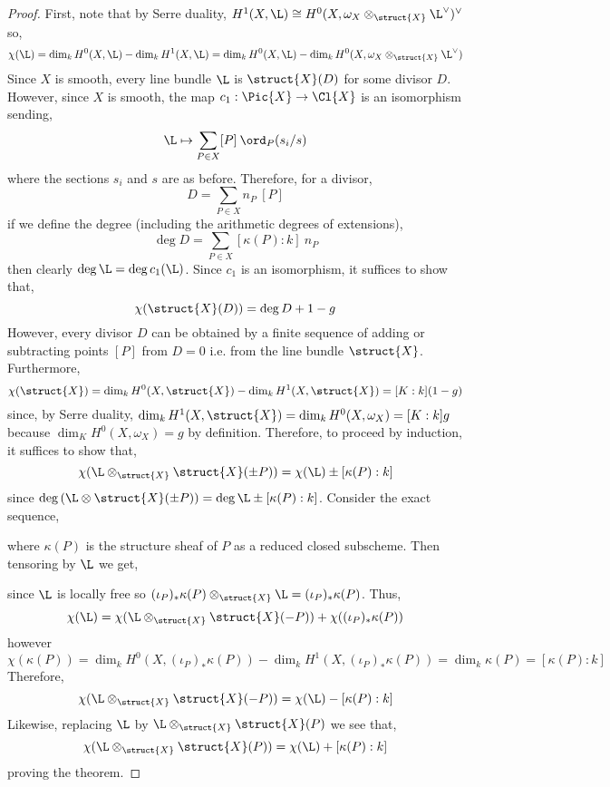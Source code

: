\begin{proof}
First, note that by Serre duality, $H^1(X, \L) \cong H^0(X, \omega_X \otimes_{\struct{X}} \L^\vee)^\vee$ so,
\[ \chi(\L) = \dim_k H^0(X, \L) - \dim_k H^1(X, \L) = \dim_k H^0(X, \L) - \dim_k H^0(X, \omega_X \otimes_{\struct{X}} \L^\vee) \]
Since $X$ is smooth, every line bundle $\L$ is $\struct{X}(D)$ for some divisor $D$. However, since $X$ is smooth, the map $c_1 : \Pic{X} \to \Cl{X}$ is an isomorphism sending,
\[ \L \mapsto \sum_{P \in X} [P] \: \ord_{P}(s_i / s) \]
where the sections $s_i$ and $s$ are as before. Therefore, for a divisor,
\[ D = \sum_{P \in X} n_P \: [P] \]
if we define the degree (including the arithmetic degrees of extensions),
\[ \deg{D} = \sum_{P \in X} [\kappa(P) : k] \: n_P \]
then clearly $\deg{\L} = \deg{c_1(\L)}$. Since $c_1$ is an isomorphism, it suffices to show that,
\[ \chi(\struct{X}(D)) = \deg{D} + 1 - g \]
However, every divisor $D$ can be obtained by a finite sequence of adding or subtracting points $[P]$ from $D = 0$ i.e. from the line bundle $\struct{X}$. Furthermore,
\[ \chi(\struct{X}) = \dim_k H^0(X, \struct{X}) - \dim_k H^1(X, \struct{X}) = [K : k] (1 - g) \]
since, by Serre duality, $\dim_k H^1(X, \struct{X}) = \dim_k H^0(X, \omega_X) = [K : k] g$ because $\dim_K H^0(X, \omega_X) = g$ by definition. Therefore, to proceed by induction, it suffices to show that,
\[ \chi(\L \otimes_{\struct{X}} \struct{X}(\pm P)) = \chi(\L) \pm [\kappa(P) : k] \]
since $\deg{(\L \otimes \struct{X}(\pm P))} = \deg{\L} \pm [\kappa(P) : k]$. Consider the exact sequence,
\begin{center}
\end{center}
where $\kappa(P)$ is the structure sheaf of $P$ as a reduced closed subscheme. Then tensoring by $\L$ we get,
\begin{center}
\end{center}
since $\L$ is locally free so $(\iota_P)_* \kappa(P) \otimes_{\struct{X}} \L = (\iota_P)_* \kappa(P)$. Thus,
\[ \chi(\L) = \chi(\L \otimes_{\struct{X}} \struct{X}(-P)) + \chi((\iota_P)_* \kappa(P)) \]
however
\[ \chi(\kappa(P)) = \dim_k H^0(X, (\iota_P)_* \kappa(P)) - \dim_k H^1(X, (\iota_P)_* \kappa(P)) = \dim_k \kappa(P) = [\kappa(P) : k] \]
Therefore,
\[ \chi(\L \otimes_{\struct{X}} \struct{X}(-P)) = \chi(\L) - [\kappa(P) : k] \]
Likewise, replacing $\L$ by $\L \otimes_{\struct{X}} \struct{X}(P)$ we see that,
\[ \chi(\L \otimes_{\struct{X}} \struct{X}(P)) = \chi(\L) + [\kappa(P) : k] \]
proving the theorem. 
\end{proof}

